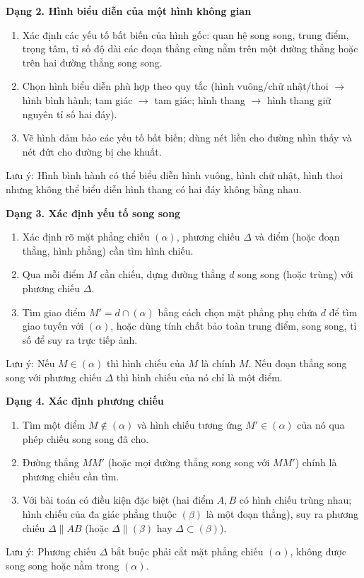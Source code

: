 \textbf{Dạng 2. Hình biểu diễn của một hình không gian}
\begin{enumerate}
\item Xác định các yếu tố bất biến của hình gốc: quan hệ song song, trung điểm, trọng tâm, tỉ số độ dài các đoạn thẳng cùng nằm trên một đường thẳng hoặc trên hai đường thẳng song song.
\item Chọn hình biểu diễn phù hợp theo quy tắc (hình vuông/chữ nhật/thoi $\to$ hình bình hành; tam giác $\to$ tam giác; hình thang $\to$ hình thang giữ nguyên tỉ số hai đáy).
\item Vẽ hình đảm bảo các yếu tố bất biến; dùng nét liền cho đường nhìn thấy và nét đứt cho đường bị che khuất.
\end{enumerate}
Lưu ý: Hình bình hành có thể biểu diễn hình vuông, hình chữ nhật, hình thoi nhưng không thể biểu diễn hình thang có hai đáy không bằng nhau.

\textbf{Dạng 3. Xác định yếu tố song song}
\begin{enumerate}
\item Xác định rõ mặt phẳng chiếu $(\alpha)$, phương chiếu $\Delta$ và điểm (hoặc đoạn thẳng, hình phẳng) cần tìm hình chiếu.
\item Qua mỗi điểm $M$ cần chiếu, dựng đường thẳng $d$ song song (hoặc trùng) với phương chiếu $\Delta$.
\item Tìm giao điểm $M' = d \cap (\alpha)$ bằng cách chọn mặt phẳng phụ chứa $d$ để tìm giao tuyến với $(\alpha)$, hoặc dùng tính chất bảo toàn trung điểm, song song, tỉ số để suy ra trực tiếp ảnh.
\end{enumerate}
Lưu ý: Nếu $M \in (\alpha)$ thì hình chiếu của $M$ là chính $M$. Nếu đoạn thẳng song song với phương chiếu $\Delta$ thì hình chiếu của nó chỉ là một điểm.

\textbf{Dạng 4. Xác định phương chiếu}
\begin{enumerate}
\item Tìm một điểm $M \notin (\alpha)$ và hình chiếu tương ứng $M' \in (\alpha)$ của nó qua phép chiếu song song đã cho.
\item Đường thẳng $MM'$ (hoặc mọi đường thẳng song song với $MM'$) chính là phương chiếu cần tìm.
\item Với bài toán có điều kiện đặc biệt (hai điểm $A, B$ có hình chiếu trùng nhau; hình chiếu của đa giác phẳng thuộc $(\beta)$ là một đoạn thẳng), suy ra phương chiếu $\Delta \parallel AB$ (hoặc $\Delta \parallel (\beta)$ hay $\Delta \subset (\beta)$).
\end{enumerate}
Lưu ý: Phương chiếu $\Delta$ bắt buộc phải cắt mặt phẳng chiếu $(\alpha)$, không được song song hoặc nằm trong $(\alpha)$.

